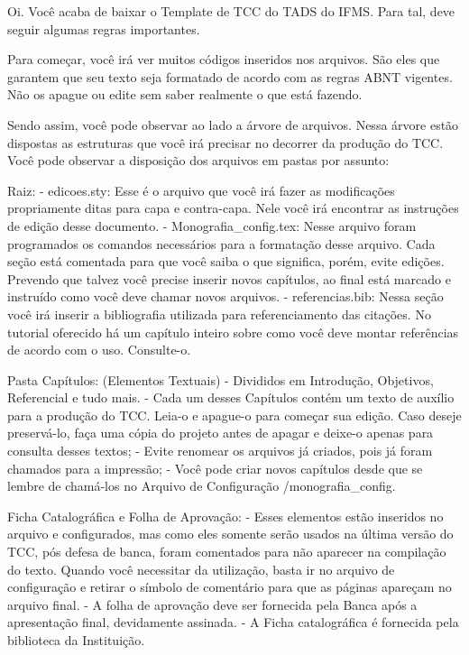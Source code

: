 Oi.
Você acaba de baixar o Template de TCC do TADS do IFMS.
Para tal, deve seguir algumas regras importantes.

Para começar, você irá ver muitos códigos inseridos nos arquivos. São eles que garantem que seu texto seja formatado de acordo com as regras ABNT vigentes. Não os apague ou edite sem saber realmente o que está fazendo.

Sendo assim, você pode observar ao lado a árvore de arquivos. Nessa árvore estão dispostas as estruturas que você irá precisar no decorrer da produção do TCC. Você pode observar a disposição dos arquivos em pastas por assunto:

Raiz: 
- edicoes.sty: Esse é o arquivo que você irá fazer as modificações propriamente ditas para capa e contra-capa. Nele você irá encontrar as instruções de edição desse documento.
- Monografia\_config.tex: Nesse arquivo foram programados os comandos necessários para a formatação desse arquivo. Cada seção está comentada para que você saiba o que significa, porém, evite edições. Prevendo que talvez você precise inserir novos capítulos, ao final está marcado e instruído como você deve chamar novos arquivos.  
- referencias.bib: Nessa seção você irá inserir a bibliografia utilizada para referenciamento das citações. No tutorial oferecido há um capítulo inteiro sobre como você deve montar referências de acordo com o uso. Consulte-o.

Pasta Capítulos: (Elementos Textuais)
- Divididos em Introdução, Objetivos, Referencial e tudo mais.
- Cada um desses Capítulos contém um texto de auxílio para a produção do TCC. Leia-o e apague-o para começar sua edição. Caso deseje preservá-lo, faça uma cópia do projeto antes de apagar e deixe-o apenas para consulta desses textos;
- Evite renomear os arquivos já criados, pois já foram chamados para a impressão;
- Você pode criar novos capítulos desde que se lembre de chamá-los no Arquivo de Configuração /monografia\_config.

Ficha Catalográfica e Folha de Aprovação: 
- Esses elementos estão inseridos no arquivo e configurados, mas como eles somente serão usados na última versão do TCC, pós defesa de banca, foram comentados para não aparecer na compilação do texto. Quando você necessitar da utilização, basta ir no arquivo de configuração e retirar o símbolo de comentário para que as páginas apareçam no arquivo final.
- A folha de aprovação deve ser fornecida pela Banca após a apresentação final, devidamente assinada.
- A Ficha catalográfica é fornecida pela biblioteca da Instituição.


